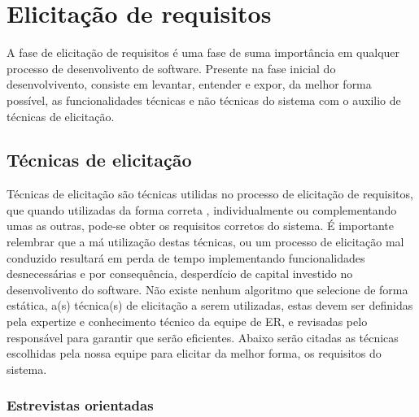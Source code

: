 \chapter{Elicitação de requisitos}

A fase de elicitação de requisitos é uma fase de suma importância em qualquer processo de  desenvolivento de software. 
Presente na fase inicial do desenvolvivento, consiste em levantar, entender e expor, da melhor forma possível, as funcionalidades técnicas e não técnicas do sistema
com o auxilio de técnicas de elicitação.

  \section{Técnicas de elicitação}
 
 Técnicas de elicitação são técnicas utilidas no processo de elicitação de requisitos, que quando utilizadas da forma correta
  , individualmente ou complementando umas as outras, pode-se obter os requisitos corretos do sistema.
  É importante relembrar que a má utilização destas técnicas, ou um processo de elicitação 
  mal conduzido resultará em perda de tempo implementando funcionalidades desnecessárias e por 
  consequência, desperdício de capital investido no desenvolivento do software.
  Não existe nenhum algoritmo que selecione de forma estática, a(s) técnica(s) de elicitação a serem utilizadas, 
  estas devem ser definidas pela expertize e conhecimento técnico da equipe de ER, e revisadas pelo responsável para garantir
  que serão eficientes.
  Abaixo serão citadas as técnicas escolhidas pela nossa equipe para elicitar da melhor forma, os requisitos do sistema.
  
  \subsection{Estrevistas orientadas}
  
